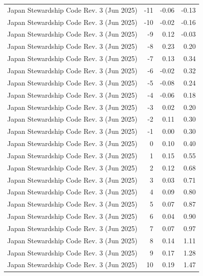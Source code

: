 \begin{table}
\begin{tabular}{lrrr}
Japan Stewardship Code Rev. 3 (Jun 2025) & -11 & -0.06 & -0.13 \\
Japan Stewardship Code Rev. 3 (Jun 2025) & -10 & -0.02 & -0.16 \\
Japan Stewardship Code Rev. 3 (Jun 2025) & -9 & 0.12 & -0.03 \\
Japan Stewardship Code Rev. 3 (Jun 2025) & -8 & 0.23 & 0.20 \\
Japan Stewardship Code Rev. 3 (Jun 2025) & -7 & 0.13 & 0.34 \\
Japan Stewardship Code Rev. 3 (Jun 2025) & -6 & -0.02 & 0.32 \\
Japan Stewardship Code Rev. 3 (Jun 2025) & -5 & -0.08 & 0.24 \\
Japan Stewardship Code Rev. 3 (Jun 2025) & -4 & -0.06 & 0.18 \\
Japan Stewardship Code Rev. 3 (Jun 2025) & -3 & 0.02 & 0.20 \\
Japan Stewardship Code Rev. 3 (Jun 2025) & -2 & 0.11 & 0.30 \\
Japan Stewardship Code Rev. 3 (Jun 2025) & -1 & 0.00 & 0.30 \\
Japan Stewardship Code Rev. 3 (Jun 2025) & 0 & 0.10 & 0.40 \\
Japan Stewardship Code Rev. 3 (Jun 2025) & 1 & 0.15 & 0.55 \\
Japan Stewardship Code Rev. 3 (Jun 2025) & 2 & 0.12 & 0.68 \\
Japan Stewardship Code Rev. 3 (Jun 2025) & 3 & 0.03 & 0.71 \\
Japan Stewardship Code Rev. 3 (Jun 2025) & 4 & 0.09 & 0.80 \\
Japan Stewardship Code Rev. 3 (Jun 2025) & 5 & 0.07 & 0.87 \\
Japan Stewardship Code Rev. 3 (Jun 2025) & 6 & 0.04 & 0.90 \\
Japan Stewardship Code Rev. 3 (Jun 2025) & 7 & 0.07 & 0.97 \\
Japan Stewardship Code Rev. 3 (Jun 2025) & 8 & 0.14 & 1.11 \\
Japan Stewardship Code Rev. 3 (Jun 2025) & 9 & 0.17 & 1.28 \\
Japan Stewardship Code Rev. 3 (Jun 2025) & 10 & 0.19 & 1.47 \\
\bottomrule
\end{tabular}
\end{table}
